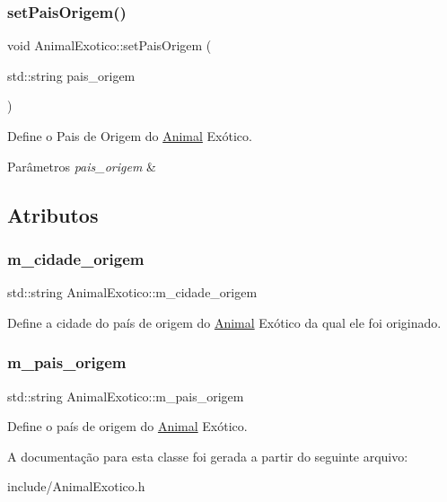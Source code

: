 \subsubsection{\texorpdfstring{set\+Pais\+Origem()}{setPaisOrigem()}}
{\footnotesize\ttfamily void Animal\+Exotico\+::set\+Pais\+Origem (\begin{DoxyParamCaption}\item[{std\+::string}]{pais\+\_\+origem }\end{DoxyParamCaption})}



Define o Pais de Origem do \hyperlink{classAnimal}{Animal} Exótico. 


\begin{DoxyParams}{Parâmetros}
{\em pais\+\_\+origem} & \\
\hline
\end{DoxyParams}


\subsection{Atributos}
\mbox{\label{classAnimalExotico_a99e6ec9acb3106efc101a828f645c1dc}} 
\subsubsection{\texorpdfstring{m\+\_\+cidade\+\_\+origem}{m\_cidade\_origem}}
{\footnotesize\ttfamily std\+::string Animal\+Exotico\+::m\+\_\+cidade\+\_\+origem\hspace{0.3cm}{\ttfamily [protected]}}

Define a cidade do país de origem do \hyperlink{classAnimal}{Animal} Exótico da qual ele foi originado. \mbox{\label{classAnimalExotico_a5a00f07c9cd9f11baadef0282eaad031}} 
\subsubsection{\texorpdfstring{m\+\_\+pais\+\_\+origem}{m\_pais\_origem}}
{\footnotesize\ttfamily std\+::string Animal\+Exotico\+::m\+\_\+pais\+\_\+origem\hspace{0.3cm}{\ttfamily [protected]}}

Define o país de origem do \hyperlink{classAnimal}{Animal} Exótico. 

A documentação para esta classe foi gerada a partir do seguinte arquivo\+:\begin{DoxyCompactItemize}
\item 
include/Animal\+Exotico.\+h\end{DoxyCompactItemize}
